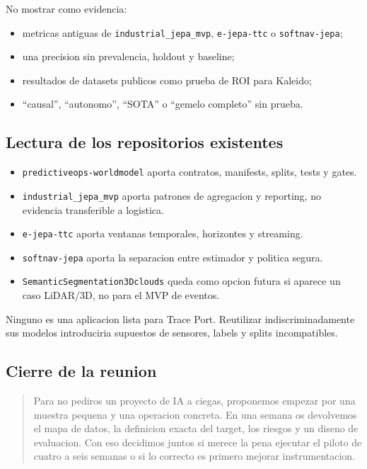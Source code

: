 \documentclass[
  spanish,
  10pt,
  a4paper,
]{article}
\providecommand{\tightlist}{%
  \setlength{\itemsep}{0pt}\setlength{\parskip}{0pt}}
\begin{document}
No mostrar como evidencia:

\begin{itemize}
\tightlist
\item
  metricas antiguas de \texttt{industrial\_jepa\_mvp},
  \texttt{e-jepa-ttc} o \texttt{softnav-jepa};
\item
  una precision sin prevalencia, holdout y baseline;
\item
  resultados de datasets publicos como prueba de ROI para Kaleido;
\item
  ``causal'', ``autonomo'', ``SOTA'' o ``gemelo completo'' sin prueba.
\end{itemize}

\subsection{Lectura de los repositorios
existentes}\label{lectura-de-los-repositorios-existentes}

\begin{itemize}
\tightlist
\item
  \texttt{predictiveops-worldmodel} aporta contratos, manifests, splits,
  tests y gates.
\item
  \texttt{industrial\_jepa\_mvp} aporta patrones de agregacion y
  reporting, no evidencia transferible a logistica.
\item
  \texttt{e-jepa-ttc} aporta ventanas temporales, horizontes y
  streaming.
\item
  \texttt{softnav-jepa} aporta la separacion entre estimador y politica
  segura.
\item
  \texttt{SemanticSegmentation3Dclouds} queda como opcion futura si
  aparece un caso LiDAR/3D, no para el MVP de eventos.
\end{itemize}

Ninguno es una aplicacion lista para Trace Port. Reutilizar
indiscriminadamente sus modelos introduciria supuestos de sensores,
labels y splits incompatibles.

\subsection{Cierre de la reunion}\label{cierre-de-la-reunion}

\begin{quote}
Para no pediros un proyecto de IA a ciegas, proponemos empezar por una
muestra pequena y una operacion concreta. En una semana os devolvemos el
mapa de datos, la definicion exacta del target, los riesgos y un diseno
de evaluacion. Con eso decidimos juntos si merece la pena ejecutar el
piloto de cuatro a seis semanas o si lo correcto es primero mejorar
instrumentacion.
\end{quote}
\end{document}
